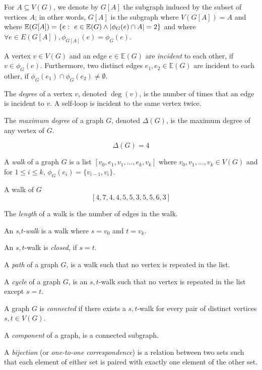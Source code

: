 \documentclass{article}
\begin{document}
	For $A \subseteq V(G)$, we denote by $G[A]$ the subgraph induced by the subset of vertices $A$; in other words, $G[A]$ is the subgraph where $V(G[A]) = A$ and where $\mathbb{E}(G[A]) = \{ e \,\colon\  e \in \mathbb{E}(G) \land |\phi_G(e) \cap A| = 2\}$ and where $\forall e \in E(G[A]), \phi_{G[A]}(e) = \phi_{G}(e)$.

	\begin{center}
		
	\end{center}

	A vertex $v \in V(G)$ and an edge $e \in \mathbb{E}(G)$ are \textit{incident} to each other, if $v \in \phi_G(e)$. Furthermore, two distinct edges $e_1,e_2 \in \mathbb{E}(G)$ are incident to each other, if $\phi_G(e_1) \cap \phi_G(e_2) \neq \emptyset$.

	The \textit{degree} of a vertex $v$, denoted $\deg(v)$, is the number of times that an edge is incident to $v$. A self-loop is incident to the same vertex twice.

	\begin{center}
		
	\end{center}

	The \textit{maximum degree} of a graph $G$, denoted $\Delta(G)$, is the maximum degree of any vertex of $G$.

	$$\Delta(G) = 4$$

	A \textit{walk} of a graph $G$ is a list $[v_0,e_1,v_1,...,e_k,v_k]$ where $v_0,v_1,...,v_k \in V(G)$ and for $1 \leq i \leq k$, $\phi_{G}(e_i) = \{v_{i-1}, v_i\}$.

	A walk of $G$ $$[4,7,4,4,5,5,3,5,5,6,3]$$

	The \textit{length} of a walk is the number of edges in the walk.
	
	An \textit{s,t-walk} is a walk where $s = v_0$ and $t = v_k$.

	An $s,t$-walk is \textit{closed}, if $s = t$.

	A \textit{path} of a graph $G$, is a walk such that no vertex is repeated in the list.

	A \textit{cycle} of a graph $G$, is an $s,t$-walk such that no vertex is repeated in the list except $s=t$.

	A graph $G$ is \textit{connected} if there exists a $s,t$-walk for every pair of distinct vertices $s,t \in V(G)$.

	A \textit{component} of a graph, is a connected subgraph.

	A \textit{bijection} (or \textit{one-to-one correspondence}) is a relation between two sets such that each element of either set is paired with exactly one element of the other set.
\end{document}
